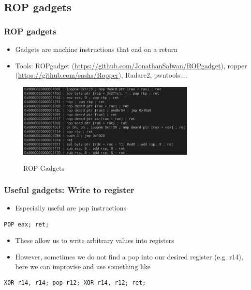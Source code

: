 \documentclass[11pt]{beamer}
\begin{document}
\subsection{ROP gadgets}
\begin{frame}
    \frametitle{ROP gadgets}
    \begin{itemize}
        \item Gadgets are machine instructions that end on a return
        \item Tools: ROPgadget (\url{https://github.com/JonathanSalwan/ROPgadget}), ropper (\url{https://github.com/sashs/Ropper}), Radare2, pwntools....
    \end{itemize}
    \begin{figure}[h]
        \caption{ROP Gadgets}
        \centering
        \includegraphics[width=0.8\textwidth]{./img/gadget.png}\label{gadget}
    \end{figure}

\end{frame}

\begin{frame}[fragile]
    \frametitle{Useful gadgets: Write to register}
    \begin{itemize}
        \item Especially useful are pop instructions
    \end{itemize}
\begin{lstlisting}[style=result]
    POP eax; ret;
\end{lstlisting}
    \begin{itemize}
        \item These allow us to write arbitrary values into registers
        \item However, sometimes we do not find a pop into our desired register (e.g. r14), here we can improvise and use something like
    \end{itemize}
\begin{lstlisting}[style=result]
XOR r14, r14; pop r12; XOR r14, r12; ret;
\end{lstlisting}
\end{frame}
\end{document}

